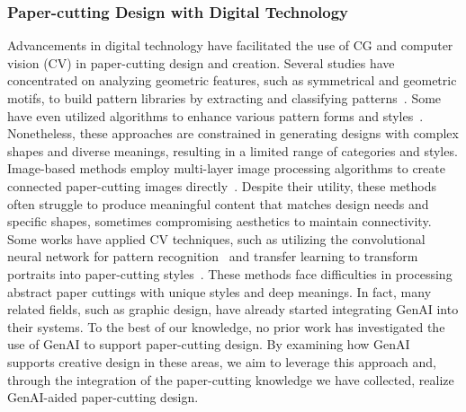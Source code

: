 \subsubsection{Paper-cutting Design with Digital Technology }
Advancements in digital technology have facilitated the use of CG and computer vision (CV) in paper-cutting design and creation. Several studies have concentrated on analyzing geometric features, such as symmetrical and geometric motifs, to build pattern libraries by extracting and classifying patterns~\cite{Zhang:2005:cag, Zhang:2006:cpc, Zhang:2009:cutout, Shui:2008:edgepaper, Liu:2018:pdf, Li:2020:aug}. Some have even utilized algorithms to enhance various pattern forms and styles~\cite{Liu:2009:rai}. Nonetheless, these approaches are constrained in generating designs with complex shapes and diverse meanings, resulting in a limited range of categories and styles.
Image-based methods employ multi-layer image processing algorithms to create connected paper-cutting images directly~\cite{Xu:2007:computer, Xu:2008:artistic, Hu:2017:tda}. Despite their utility, these methods often struggle to produce meaningful content that matches design needs and specific shapes, sometimes compromising aesthetics to maintain connectivity.
Some works have applied CV techniques, such as utilizing the convolutional neural network for pattern recognition~\cite{Liu:2020:intcut} and transfer learning to transform portraits into paper-cutting styles~\cite{Meng:2010:apc}. These methods face difficulties in processing abstract paper cuttings with unique styles and deep meanings. In fact, many related fields, such as graphic design, have already started integrating GenAI into their systems. To the best of our knowledge, no prior work has investigated the use of GenAI to support paper-cutting design. By examining how GenAI supports creative design in these areas, we aim to leverage this approach and, through the integration of the paper-cutting knowledge we have collected, realize GenAI-aided paper-cutting design.

